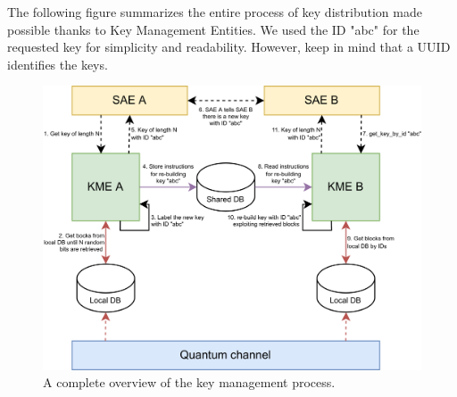 The following figure summarizes the entire process of key distribution made possible thanks to Key Management Entities. We used the ID "abc" for the requested key for simplicity and readability. However, keep in mind that a UUID identifies the keys.

\begin{figure}[H]
    \centering
    \includegraphics[width=1.0\textwidth]{Images/sequence_diagram.png}
    \caption{A complete overview of the key management process.}
    \label{fig:sequence_diagram}
\end{figure}
